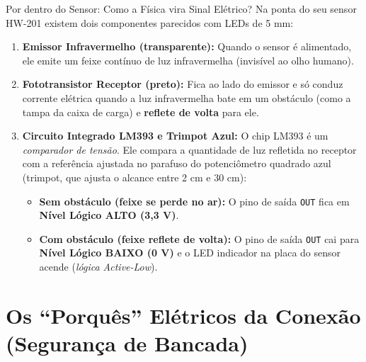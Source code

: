 \documentclass[11pt,a4paper]{article}
\begin{document}
\begin{theorybox}{Por dentro do Sensor: Como a Física vira Sinal Elétrico?}
Na ponta do seu sensor HW-201 existem dois componentes parecidos com LEDs de 5 mm:
\begin{enumerate}[leftmargin=*]
    \item \textbf{Emissor Infravermelho (transparente):} Quando o sensor é alimentado, ele emite um feixe contínuo de luz infravermelha (invisível ao olho humano).
    \item \textbf{Fototransistor Receptor (preto):} Fica ao lado do emissor e só conduz corrente elétrica quando a luz infravermelha bate em um obstáculo (como a tampa da caixa de carga) e \textbf{reflete de volta} para ele.
    \item \textbf{Circuito Integrado LM393 e Trimpot Azul:} O chip LM393 é um \textit{comparador de tensão}. Ele compara a quantidade de luz refletida no receptor com a referência ajustada no parafuso do potenciômetro quadrado azul (trimpot, que ajusta o alcance entre 2 cm e 30 cm):
    \begin{itemize}
        \item \textbf{Sem obstáculo (feixe se perde no ar):} O pino de saída \texttt{OUT} fica em \textbf{Nível Lógico ALTO (3,3 V)}.
        \item \textbf{Com obstáculo (feixe reflete de volta):} O pino de saída \texttt{OUT} cai para \textbf{Nível Lógico BAIXO (0 V)} e o LED indicador na placa do sensor acende (\textit{lógica Active-Low}).
    \end{itemize}
\end{enumerate}
\end{theorybox}

\section{Os ``Porquês'' Elétricos da Conexão (Segurança de Bancada)}
\end{document}
